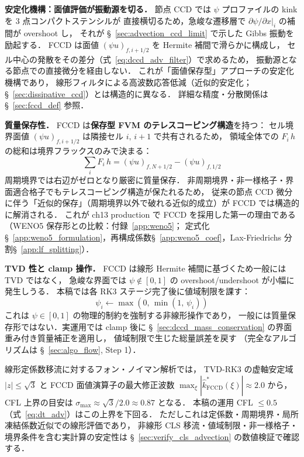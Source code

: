 \medskip
\noindent\textbf{安定化機構：面値評価が振動源を切る．}
節点 CCD では $\psi$ プロファイルの kink を 3 点コンパクトステンシルが
直接横切るため，急峻な遷移層で $\partial\psi/\partial x|_i$ の補間が overshoot し，
それが §~\ref{sec:advection_ccd_limit} で示した Gibbs 振動を励起する．
FCCD は面値 $(\psi u)_{f,i+1/2}$ を Hermite 補間で滑らかに構成し，
セル中心の発散をその差分（式~\eqref{eq:dccd_adv_filter}）で求めるため，
振動源となる節点での直接微分を経由しない．
これが「面値保存型」アプローチの安定化機構であり，
線形フィルタによる高波数応答低減（近似的安定化；§~\ref{sec:dissipative_ccd}）とは構造的に異なる．
詳細な精度・分散関係は §~\ref{sec:fccd_def} 参照．

\medskip
\noindent\textbf{質量保存性．}
FCCD は\textbf{保存型 FVM のテレスコーピング構造}を持つ：
セル境界面値 $(\psi u)_{f,i+1/2}$ は隣接セル $i,\,i+1$ で共有されるため，
領域全体での $F_i\,h$ の総和は境界フラックスのみで決まる：
\[
  \sum_i F_i\,h = (\psi u)_{f,N+1/2} - (\psi u)_{f,1/2}
\]
周期境界では右辺がゼロとなり厳密に質量保存．
非周期境界・非一様格子・界面適合格子でもテレスコーピング構造が保たれるため，
従来の節点 CCD 微分に伴う「近似的保存」（周期境界以外で破れる近似的成立）が
FCCD では構造的に解消される．
これが ch13 production で FCCD を採用した第一の理由である
（WENO5 保存形との比較：付録~\ref{app:weno5}；
定式化§~\ref{app:weno5_formulation}，再構成係数§~\ref{app:weno5_coef}，Lax-Friedrichs 分割§~\ref{app:lf_splitting}）．

\medskip
\noindent\textbf{TVD 性と clamp 操作．}
FCCD は線形 Hermite 補間に基づくため一般には TVD ではなく，
急峻な界面では $\psi \notin [0,1]$ の overshoot/undershoot が小幅に発生しうる．
本稿では各 RK3 ステージ完了後に値域制限を課す：
\begin{equation}
  \psi_i \leftarrow \max(0,\,\min(1,\,\psi_i))
  \label{eq:psi_clamp}
\end{equation}
\label{warn:adv_clamp}%
これは $\psi \in [0,1]$ の物理的制約を強制する非線形操作であり，
一般には質量保存形ではない．実運用では clamp 後に
§~\ref{sec:dccd_mass_conservation} の界面重み付き質量補正を適用し，
値域制限で生じた総量誤差を戻す
（完全なアルゴリズムは §~\ref{sec:algo_flow}, Step 1）．

\begin{tcolorbox}[warnbox, title={線形 CFL 上界の目安（FCCD + TVD-RK3，線形理論・未検証）}]
\label{result:dccd_stability}%
線形定係数移流に対するフォン・ノイマン解析では，
TVD-RK3 の虚軸安定域 $|z|\le\sqrt{3}$ と
FCCD 面値演算子の最大修正波数
$\max_\xi |\hat{k}^*_{\mathrm{FCCD}}(\xi)| \approx 2.0$
から，CFL 上界の目安は $\sigma_{\max} \approx \sqrt{3}/2.0 \approx 0.87$ となる．
本稿の運用 CFL $\leq 0.5$（式~\eqref{eq:dt_adv}）はこの上界を下回る．
ただしこれは定係数・周期境界・局所凍結係数近似での線形評価であり，
非線形 CLS 移流・値域制限・非一様格子・境界条件を含む実計算の安定性は
§~\ref{sec:verify_cls_advection} の数値検証で確認する．
\end{tcolorbox}

